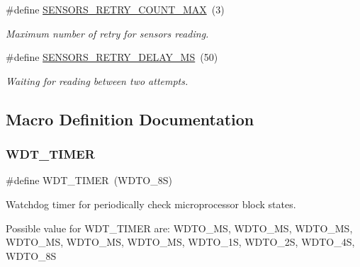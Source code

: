 \begin{DoxyCompactItemize}
\mbox{\label{i2c-th-config_8h_a16fa5577ef44bb1146f17a3bc43194b1}} 
\#define \hyperlink{i2c-th-config_8h_a16fa5577ef44bb1146f17a3bc43194b1}{S\+E\+N\+S\+O\+R\+S\+\_\+\+R\+E\+T\+R\+Y\+\_\+\+C\+O\+U\+N\+T\+\_\+\+M\+AX}~(3)
\begin{DoxyCompactList}\small\item\em Maximum number of retry for sensors reading. \end{DoxyCompactList}\item 
\mbox{\label{i2c-th-config_8h_a8ea8eeea7855628652f697bab3d173b5}} 
\#define \hyperlink{i2c-th-config_8h_a8ea8eeea7855628652f697bab3d173b5}{S\+E\+N\+S\+O\+R\+S\+\_\+\+R\+E\+T\+R\+Y\+\_\+\+D\+E\+L\+A\+Y\+\_\+\+MS}~(50)
\begin{DoxyCompactList}\small\item\em Waiting for reading between two attempts. \end{DoxyCompactList}\end{DoxyCompactItemize}


\subsection{Macro Definition Documentation}
\mbox{\label{i2c-th-config_8h_a983c9777673ee873f12ec9f489215321}} 
\subsubsection{\texorpdfstring{W\+D\+T\+\_\+\+T\+I\+M\+ER}{WDT\_TIMER}}
{\footnotesize\ttfamily \#define W\+D\+T\+\_\+\+T\+I\+M\+ER~(W\+D\+T\+O\+\_\+8S)}



Watchdog timer for periodically check microprocessor block states. 

Possible value for W\+D\+T\+\_\+\+T\+I\+M\+ER are\+: W\+D\+T\+O\+\_\+MS, W\+D\+T\+O\+\_\+MS, W\+D\+T\+O\+\_\+MS, W\+D\+T\+O\+\_\+MS, W\+D\+T\+O\+\_\+MS, W\+D\+T\+O\+\_\+MS, W\+D\+T\+O\+\_\+1S, W\+D\+T\+O\+\_\+2S, W\+D\+T\+O\+\_\+4S, W\+D\+T\+O\+\_\+8S 